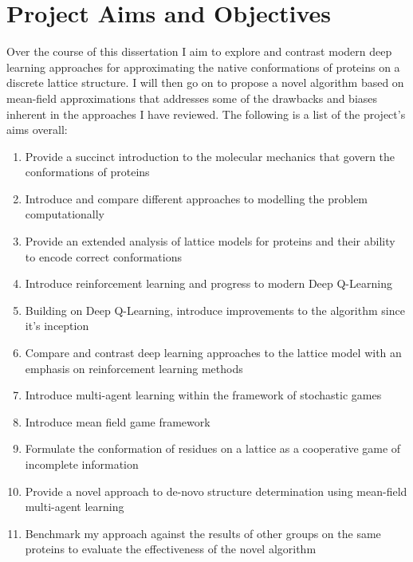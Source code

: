 \section{Project Aims and Objectives}
   Over the course of this dissertation I aim to explore and contrast
   modern deep learning approaches for approximating the native conformations
   of proteins on a discrete lattice structure. I will then go on to propose
   a novel algorithm based on mean-field approximations that addresses 
   some of the drawbacks and biases inherent in the approaches I have reviewed.
   \linebreak
   The following is a list of the project's aims overall:
   \begin{enumerate}
      \item Provide a succinct introduction to the molecular mechanics that govern the conformations of proteins
      \item Introduce and compare different approaches to modelling the problem computationally
      \item Provide an extended analysis of lattice models for proteins and their ability to encode correct conformations
      \item Introduce reinforcement learning and progress to modern Deep Q-Learning
      \item Building on Deep Q-Learning, introduce improvements to the algorithm since it's inception
      \item Compare and contrast deep learning approaches to the lattice model with an emphasis on reinforcement learning methods
      \item Introduce multi-agent learning within the framework of stochastic games
      \item Introduce mean field game framework
      \item Formulate the conformation of residues on a lattice as a cooperative game of incomplete information
      \item Provide a novel approach to de-novo structure determination using mean-field multi-agent learning
      \item Benchmark my approach against the results of other groups on the same proteins to evaluate the effectiveness of the novel algorithm
   \end{enumerate}
